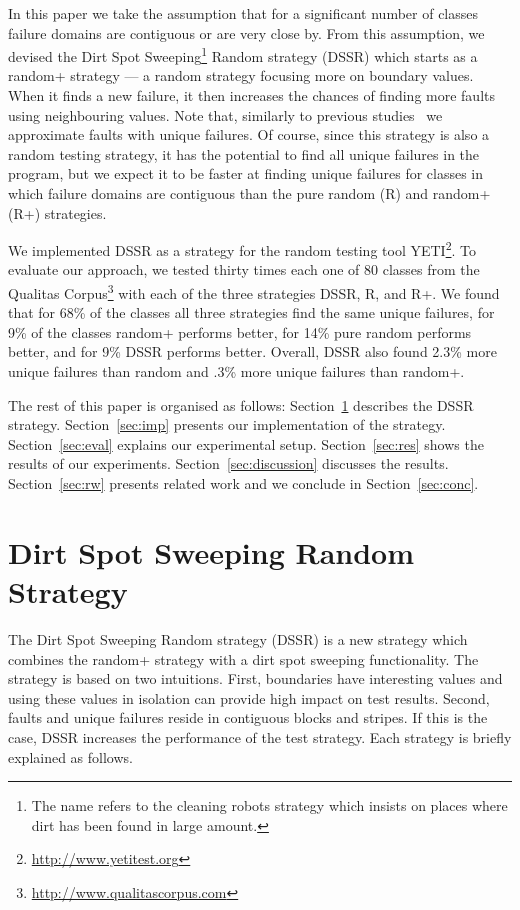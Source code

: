 \documentclass{acm_proc_article-sp}
\begin{document}
In this paper we take the assumption that for a significant number of classes failure domains are contiguous or are very close by. From this assumption, we devised the Dirt Spot Sweeping\footnote{The name refers to the cleaning robots strategy which insists on places where dirt has been found in large amount.} Random strategy (DSSR) which starts as a random+ strategy --- a random strategy focusing more on boundary values. When it finds a new failure, it then increases the chances of finding more faults using neighbouring values. Note that, similarly to previous studies~\cite{Oriol2012} we approximate faults with unique failures. Of course, since this strategy is also a random testing strategy, it has the potential to find all unique failures in the program, but we expect it to be faster at finding unique failures for classes in which failure domains are contiguous than the pure random (R) and random+ (R+) strategies.

We implemented DSSR as a strategy for the random testing tool YETI\footnote{\url{http://www.yetitest.org}}. To evaluate our approach, we tested thirty times each one of 80 classes from the Qualitas Corpus\footnote{\url{http://www.qualitascorpus.com}} with each of the three strategies DSSR, R, and R+. We found that for 68\% of the classes all three strategies find the same unique failures, for 9\% of the classes random+ performs better, for 14\% pure random performs better, and for 9\% DSSR performs better.
Overall, DSSR also found 2.3\% more unique failures than random and .3\% more unique failures than random+.


The rest of this paper is organised as follows:
Section~\ref{sec:dssr} describes the DSSR strategy. Section~\ref{sec:imp} presents our implementation of the strategy. Section~\ref{sec:eval} explains our experimental setup. Section~\ref{sec:res} shows the results of our experiments. Section~\ref{sec:discussion} discusses the results. Section~\ref{sec:rw} presents related work and we conclude in Section~\ref{sec:conc}.





\section{Dirt Spot Sweeping Random Strategy}\label{sec:dssr}
The Dirt Spot Sweeping Random strategy (DSSR) is a new strategy which combines the random+ strategy with a dirt spot sweeping functionality. The strategy is based on two intuitions. First, boundaries have interesting values and using these values in isolation can provide high impact on test results. Second, faults and unique failures reside in contiguous blocks and stripes. If this is the case, DSSR increases the performance of the test strategy. Each strategy is briefly explained as follows.
\end{document}
